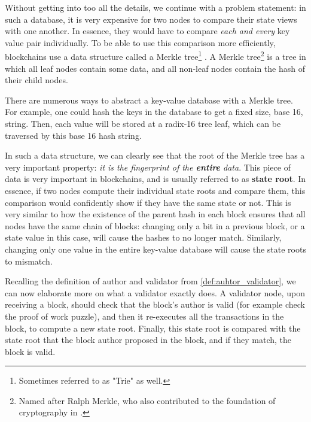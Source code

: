 Without getting into too all the details, we continue with a problem statement: in such a database,
it is very expensive for two nodes to compare their state views with one another. In essence, they
would have to compare \textit{each and every} key value pair individually. To be able to use this
comparison more efficiently, blockchains use a data structure called a Merkle
tree\footnote{Sometimes referred to as "Trie" as well.} \cite{merkleDigitalSignatureBased1988}. A
Merkle tree\footnote{Named after Ralph Merkle, who also contributed to the foundation of
cryptography in \cite{merkleSecureCommunicationsInsecure1978}.} is a tree in which all leaf nodes
contain some data, and all non-leaf nodes contain the hash of their child nodes.

There are numerous ways to abstract a key-value database with a Merkle tree. For example, one could
hash the keys in the database to get a fixed size, base 16, string. Then, each value will be stored
at a radix-16 tree leaf, which can be traversed by this base 16 hash string.


In such a data structure, we can clearly see that the root of the Merkle tree has a very important
property: \textit{it is the fingerprint of the \textbf{entire} data}. This piece of data is very
important in blockchains, and is usually referred to as \textbf{state root}. In essence, if two
nodes compute their individual state roots and compare them, this comparison would confidently show
if they have the same state or not. This is very similar to how the existence of the parent hash in
each block ensures that all nodes have the same chain of blocks: changing only a bit in a previous
block, or a state value in this case, will cause the hashes to no longer match. Similarly, changing
only one value in the entire key-value database will cause the state roots to mismatch.

Recalling the definition of author and validator from \ref{def:auhtor_validator}, we can now
elaborate more on what a validator exactly does. A validator node, upon receiving a block, should
check that the block's author is valid (for example check the proof of work puzzle), and then it
re-executes all the transactions in the block, to compute a new state root. Finally, this state root
is compared with the state root that the block author proposed in the block, and if they match, the
block is valid.

